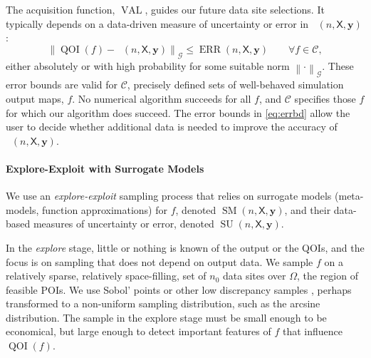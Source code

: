 \documentclass[11pt]{NSFamsart}
\DeclareMathOperator{\QOI}{QOI} %
\DeclareMathOperator{\APP}{\widehat{\QOI}}
\DeclareMathOperator{\SURR}{SM} %
\DeclareMathOperator{\ERR}{ERR}
\DeclareMathOperator{\VAL}{VAL}
\DeclareMathOperator{\SURRERR}{SU}
\newcommand{\mX}{\mathsf{X}}
\newcommand{\by}{{\boldsymbol{y}}}
\newcommand{\calc}{{\mathcal{C}}}
\newcommand{\calg}{{\mathcal{G}}}
\newcommand{\norm}[2][{}]{\ensuremath{\left \lVert #2 \right \rVert}_{#1}}
\newcommand{\bignorm}[2][{}]{\ensuremath{\bigl \lVert #2 \bigr \rVert}_{#1}}
\begin{document}
The acquisition function, $\VAL$, guides our future data site selections.  It typically depends on a data-driven measure of uncertainty or error in $\APP(n,\mX,\by)$: 
\begin{equation} \label{eq:errbd}
    \bignorm[\calg]{\QOI(f) - \APP(n,\mX,\by)} \le \ERR(n,\mX,\by) \qquad \forall f \in \calc,
\end{equation}
either absolutely or with high probability for some suitable norm $\norm[\calg]{\cdot}$.  These error bounds are valid for $\calc$,  precisely defined sets of well-behaved simulation output maps, $f$.  No numerical algorithm succeeds for all $f$, and $\calc$ specifies those $f$ for which our algorithm does succeed. The error bounds in \eqref{eq:errbd} allow the user to decide whether additional data is needed to improve the accuracy of $\APP(n,\mX,\by)$.





\paragraph*{Explore-Exploit with Surrogate Models} We use an \emph{explore-exploit} sampling process that relies on surrogate models (meta-models, function approximations) for $f$, denoted $\SURR(n,\mX,\by)$, and their data-based measures of uncertainty or error, denoted $\SURRERR(n,\mX,\by)$.  

In the \emph{explore} stage, little or nothing is known of the output or the QOIs, and the focus is on sampling that does not depend on output data.  We sample $f$ on a relatively sparse, relatively space-filling, set of $n_0$ data sites over $\Omega$, the region of feasible POIs.  We use  Sobol' points or other low discrepancy samples \cite{DicPil10a}, perhaps transformed to a non-uniform sampling distribution, such as the arcsine distribution. The sample in the explore stage must be small enough to be economical, but large enough to detect important features of $f$ that influence $\QOI(f)$.
\end{document}
